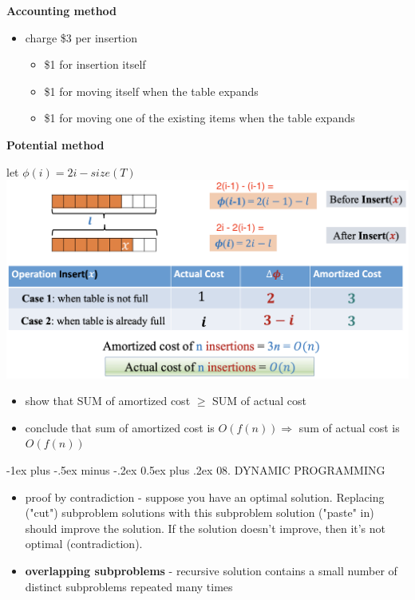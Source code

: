 \documentclass[10pt, landscape]{article}
\makeatletter
\renewcommand{\section}{\@startsection{section}{1}{0mm}%
  {-1ex plus -.5ex minus -.2ex}%
  {0.5ex plus .2ex}%
{\normalfont\large\bfseries}}
\makeatother
\begin{document}
\begin{multicols*}{4}
  \textbf{Accounting method}

  \begin{itemize}
    \item charge \$3 per insertion
      \begin{itemize}
        \item \$1 for insertion itself
        \item \$1 for moving itself when the table expands
        \item \$1 for moving one of the existing items when the table expands
      \end{itemize}
  \end{itemize}

  \textbf{Potential method}

  \begin{tightcenter}
    let $\phi(i) = 2i - size(T)$
    \includegraphics[width=0.95\linewidth]{st2131-dynamic-table-potential-method.png} 
  \end{tightcenter}

  \begin{itemize}
    \item show that SUM of amortized cost $\geq$ SUM of actual cost
    \item conclude that sum of amortized cost is $O(f(n)) \Rightarrow$ sum of actual cost is $O(f(n))$
  \end{itemize}


  \section{08. DYNAMIC PROGRAMMING}

  \begin{itemize}
    \item {} proof by contradiction - suppose you have an optimal solution. Replacing ("cut") subproblem solutions with this subproblem solution ("paste" in) should improve the solution. If the solution doesn't improve, then it's not optimal (contradiction).
    \item \textbf{overlapping subproblems} - recursive solution contains a small number of distinct subproblems repeated many times
  \end{itemize}


\end{multicols*}
\end{document}
